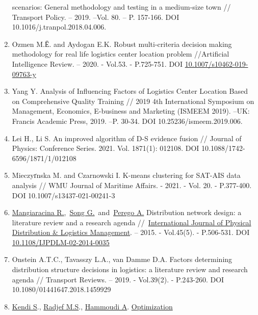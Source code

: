 \begin{enumerate}
  scenarios: General methodology and testing in a medium-size town //
  Transport Policy. -- 2019. --Vol. 80. -- P. 157-166. DOI
  10.1016/j.tranpol.2018.04.006.
\item
  Ozmen M.Ё. and Aydogan E.K. Robust multi-criteria decision making
  methodology for real life logistics center location problem
  //Artificial Intelligence Review. -- 2020. - Vol.53. - P.725-751. DOI
  \href{https://link.springer.com/article/10.1007/s10462-019-09763-y}{10.1007/s10462-019-09763-y}
\item
  Yang Y. Analysis of Influencing Factors of Logistics Center Location
  Based on Comprehensive Quality Training // 2019 4th International
  Symposium on Management, Economics, E-business and Marketing (ISMEEM
  2019). --UK: Francis Academic Press, 2019. --P. 30-34. DOI
  10.25236/ismeem.2019.006.
\item
  Lei H., Li S. An improved algorithm of D-S evidence fusion // Journal
  of Physics: Conference Series. 2021. Vol. 1871(1): 012108. DOI
  10.1088/1742-6596/1871/1/012108
\item
  Mieczyґnska M. and Czarnowski I. K-means clustering for SAT-AIS data
  analysis // WMU Journal of Maritime Affairs. - 2021. - Vol. 20. -
  P.377-400. DOI 10.1007/s13437-021-00241-3
\item
  \href{https://www.emerald.com/insight/search?q=Riccardo\%20Mangiaracina}{Mangiaracina
  R.},~\href{https://www.emerald.com/insight/search?q=Guang\%20Song}{Song
  G.}~and~\href{https://www.emerald.com/insight/search?q=Alessandro\%20Perego}{Perego
  A.} Distribution network design: a literature review and a research
  agenda
  //~\href{https://www.emerald.com/insight/publication/issn/0960-0035}{International
  Journal of Physical Distribution \& Logistics Management}. -- 2015. -
  Vol.45(5). - P.506-531. DOI
  \href{http://dx.doi.org/10.1108/IJPDLM-02-2014-0035}{10.1108/IJPDLM-02-2014-0035}
\item
  Onstein A.T.C., Tavasszy L.A., van Damme D.A. Factors determining
  distribution structure decisions in logistics: a literature review and
  research agenda // Transport Reviews. -- 2019. - Vol.39(2). -
  P.243-260. DOI 10.1080/01441647.2018.1459929
\item
  \href{https://www.webofscience.com/wos/author/record/24657901}{Kendi
  S}.,
  \href{https://www.webofscience.com/wos/author/record/13850822}{Radjef
  M.S}.,
  \href{https://www.webofscience.com/wos/author/record/29644444}{Hammoudi
  A}.
  \href{https://www.webofscience.com/wos/woscc/full-record/WOS:000598477800004}{Optimization
}
\end{enumerate}
